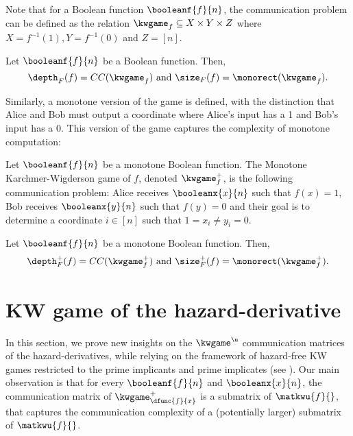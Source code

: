 \documentclass[acmsmall, nonacm, authorversion]{acmart}
\begin{document}
Note that for a Boolean function $\booleanf{f}{n}$, the communication problem can be defined as the relation $\kwgame_{f}\subseteq X\times Y\times Z$ where $X=f^{-1}(1), Y=f^{-1}(0)$ and $Z=[n]$. 

\begin{theorem}\label{thm:kw-classic}
Let $\booleanf{f}{n}$ be a Boolean function. Then,
\[
    \text{$\depth_{F}(f)=CC(\kwgame_{f})$ and $\size_{F}(f)=\monorect(\kwgame_{f})$} .
\]
\end{theorem}

Similarly, a monotone version of the game is defined, with the distinction that Alice and Bob must output a coordinate where Alice's input has a 1 and Bob's input has a 0. This version of the game captures the complexity of monotone computation:

\begin{definition}\label{def:monotone-kw-game}
Let $\booleanf{f}{n}$ be a monotone Boolean function. The Monotone Karchmer-Wigderson game of $f$, denoted $\kwgame_{f}^{+}$, is the following communication problem: Alice receives $\booleanx{x}{n}$ such that $f(x)=1$, Bob receives $\booleanx{y}{n}$ such that $f(y)=0$ and their goal is to determine a coordinate $i\in[n]$ such that $1=x_{i} \neq y_{i}=0$.
\end{definition}

\begin{theorem}\label{thm:kw-monotone}
Let $\booleanf{f}{n}$ be a monotone Boolean function. Then,
\[
    \text{$\depth_{F}^{+}(f)=CC(\kwgame_{f}^{+})$ and $\size_{F}^{+}(f)=\monorect(\kwgame_{f}^{+})$}.
\]
\end{theorem}

\section{KW game of the hazard-derivative}\label{sec:kw-games-of-the-derivative}
In this section, we prove new insights on the $\kwgame^{\u}$ communication matrices of the hazard-derivatives, while relying on the framework of hazard-free KW games restricted to the prime implicants and prime implicates (see ). Our main observation is that for every $\booleanf{f}{n}$ and $\booleanx{x}{n}$, the communication matrix of $\kwgame^+_{\dfunc{f}{x}}$ is a submatrix of $\matkwu{f}{}$, that captures the communication complexity of a (potentially larger) submatrix of $\matkwu{f}{}$.
\end{document}

